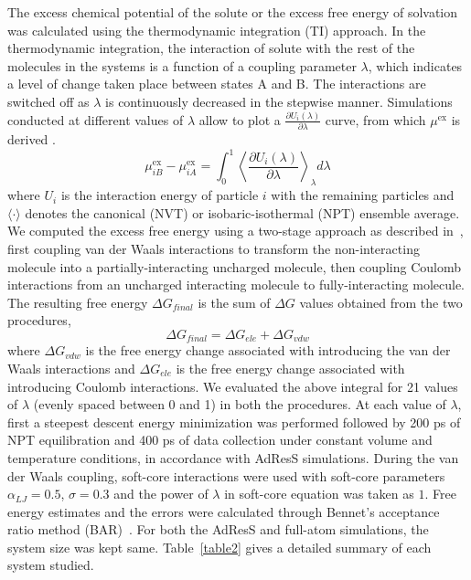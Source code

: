 \documentclass[a4paper,preprint,unsortedaddress]{revtex4-1}
\newcommand{\exc}{{\textrm{ex}}}
\begin{document}
The excess chemical potential of the solute or the excess free energy of solvation was calculated using the 
thermodynamic integration (TI) approach. In the thermodynamic integration, the 
interaction of solute with the rest of the molecules in the systems is a function 
of a coupling parameter $\lambda$, which indicates a level of change taken place between states
A and B. The interactions are switched off as $\lambda$ is 
continuously decreased in the stepwise manner. Simulations conducted at different values of 
$\lambda$ allow to plot a {$\frac{\partial U_{i}(\lambda)}{\partial \lambda}$} curve, from which 
$\mu^{\exc}$ is derived \cite{mu}. 
{
\begin{equation}
 \mu^\exc_{iB} - \mu^\exc_{iA} = \int_{0}^{1} \left \langle \frac{\partial U_{i}(\lambda)}{\partial \lambda} \right \rangle_{\lambda} d\lambda 
\end{equation}
}
where $U_{i}$ is the interaction energy of particle $i$ with the remaining particles and $\langle \cdot \rangle$
denotes the canonical (NVT) or isobaric-isothermal (NPT) ensemble average. We computed the excess 
free energy using a two-stage approach as described in~\cite{mobley}, first coupling van der Waals interactions to transform the 
non-interacting molecule into a partially-interacting uncharged molecule, then coupling Coulomb
interactions from an uncharged interacting molecule to fully-interacting molecule. The resulting 
free energy $\Delta G_{final}$ is the sum of $\Delta G$ values obtained from the two procedures,
\begin{equation}
 \Delta G_{final} = \Delta G_{ele} + \Delta G_{vdw}
\end{equation}
where $\Delta G_{vdw}$ is the free energy change associated with introducing the van der Waals interactions and 
$\Delta G_{ele}$ is the free energy change associated with introducing Coulomb interactions. 
We evaluated the above integral for 21 values of $\lambda$ (evenly spaced between 0 and 1) in both the procedures.
At each value of $\lambda$, first a steepest descent energy minimization was performed followed 
by 200 ps of NPT equilibration and 400 ps of data collection under constant volume and temperature
conditions, in accordance with AdResS simulations. 
During the van der Waals coupling, soft-core interactions were used with soft-core parameters $\alpha_{LJ} = 0.5$, 
$\sigma = 0.3$ and the power of $\lambda$ in soft-core equation was taken as $1$. Free energy estimates and the errors
were calculated through Bennet's acceptance ratio method (BAR)~\cite{bar}. 
For both the AdResS and full-atom simulations, the system size was kept same.
{Table~\ref{table2} gives a detailed summary of each system studied}.\\
\end{document}
